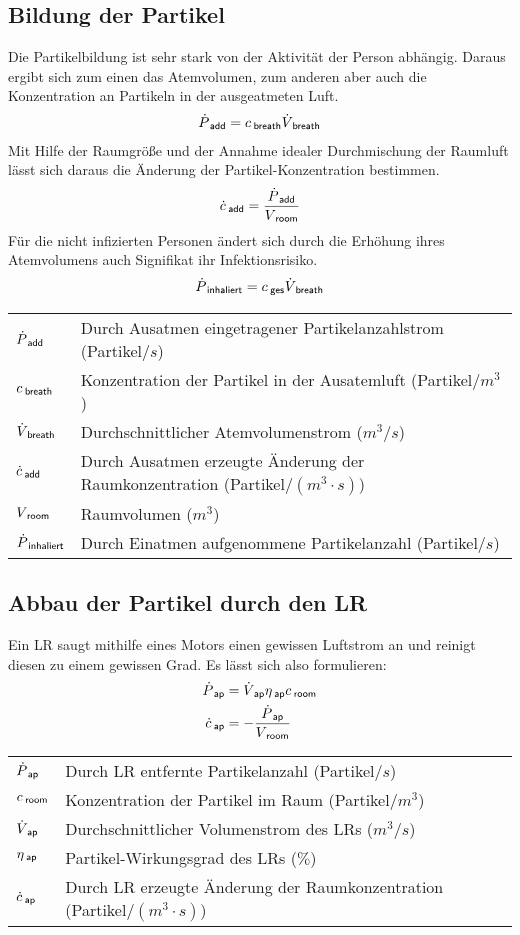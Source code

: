 \documentclass[12pt,a4paper,bibtotocnumbered,liststotocnumbered]{scrreprt}
\begin{document}
\subsection{Bildung der Partikel}
Die Partikelbildung ist sehr stark von der Aktivität der Person abhängig. Daraus ergibt sich zum einen das Atemvolumen, zum anderen aber auch die Konzentration an Partikeln in der ausgeatmeten Luft.
\begin{align}
\dot{P}_{\: \mathsf{add}} = c_{\: \mathsf{breath}}\dot{V}_{\: \mathsf{breath}}
\end{align}
Mit Hilfe der Raumgröße und der Annahme idealer Durchmischung der Raumluft lässt sich daraus die Änderung der Partikel-Konzentration bestimmen.
\begin{align}
\dot{c}_{\: \mathsf{add}} =\frac{\dot{P}_{\: \mathsf{add}}}{V_{\: \mathsf{room}}}
\end{align}
Für die nicht infizierten Personen ändert sich durch die Erhöhung ihres Atemvolumens auch Signifikat ihr Infektionsrisiko.
\begin{align}
\dot{P}_{\: \mathsf{inhaliert}} = c_{\: \mathsf{ges}}\dot{V}_{\: \mathsf{breath}}
\end{align}
\begin{tabular}{ll}
$\dot{P}_{\: \mathsf{add}}$ & Durch Ausatmen eingetragener Partikelanzahlstrom (Partikel$/s$)\\
$c_{\: \mathsf{breath}}$ & Konzentration der Partikel in der Ausatemluft (Partikel$/m^3$)\\
$\dot{V}_{\: \mathsf{breath}}$ & Durchschnittlicher Atemvolumenstrom ($m^3/s$)\\
$\dot{c}_{\: \mathsf{add}}$ & Durch Ausatmen erzeugte Änderung der  Raumkonzentration (Partikel$/(m^3\cdot s)$)\\
$V_{\: \mathsf{room}}$ & Raumvolumen ($m^3$)\\
$\dot{P}_{\: \mathsf{inhaliert}}$ & Durch Einatmen aufgenommene Partikelanzahl (Partikel$/s$)\\
\end{tabular}


\subsection{Abbau der Partikel durch den \acl{LR}}
Ein \ac{LR} saugt mithilfe eines Motors einen gewissen Luftstrom an und reinigt diesen zu einem gewissen Grad. Es lässt sich also formulieren:
\begin{align}
\dot{P}_{\: \mathsf{ap}} &=\dot{V}_{\: \mathsf{ap}} \eta_{\: \mathsf{ap}} c_{\: \mathsf{room}}\\
\dot{c}_{\: \mathsf{ap}} &=-\frac{\dot{P}_{\: \mathsf{ap}}}{V_{\: \mathsf{room}}}
\end{align}
\begin{tabular}{ll}
$\dot{P}_{\: \mathsf{ap}}$ & Durch \ac{LR} entfernte Partikelanzahl (Partikel$/s$)\\
$c_{\: \mathsf{room}}$ & Konzentration der Partikel im Raum (Partikel$/m^3$)\\
$\dot{V}_{\: \mathsf{ap}}$ & Durchschnittlicher Volumenstrom des \acp{LR} ($m^3/s$)\\
$\eta_{\: \mathsf{ap}}$ & Partikel-Wirkungsgrad des \acp{LR} ($\%$)\\
$\dot{c}_{\: \mathsf{ap}}$ & Durch \ac{LR} erzeugte Änderung der  Raumkonzentration (Partikel$/(m^3\cdot s)$)\\
\end{tabular}
\end{document}
